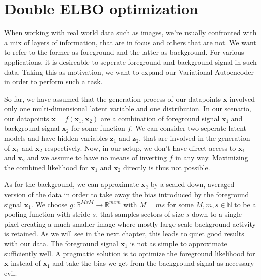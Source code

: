 \documentclass[12pt]{report}
\theoremstyle{definition}
\begin{document}
\section{Double ELBO optimization}
When working with real world data such as images, we're usually confronted with a mix of layers of information, that are in focus and others that are not. We want to refer to the former as foreground and the latter as background. For various applications, it is desireable to seperate foreground and background signal in such data. Taking this as motivation, we want to expand our Variational Autoencoder in order to perform such a task.

So far, we have assumed that the generation process of our datapoints $\mathbf{x}$ involved only one multi-dimensional latent variable and one distribution. In our scenario, our datapoints $\mathbf{x} = f(\mathbf{x}_1, \mathbf{x}_2)$ are a combination of foreground signal $\mathbf{x}_1$ and background signal $\mathbf{x}_2$ for some function $f$.
We can consider two seperate latent models and have hidden variables $\mathbf{z}_1$ and $\mathbf{z}_2$, that are involved in the generation of $\mathbf{x}_1$ and $\mathbf{x}_2$ respectively. Now, in our setup, we don't have direct access to $\mathbf{x}_1$ and $\mathbf{x}_2$ and we assume to have no means of inverting $f$ in any way. Maximizing the combined likelihood for $\mathbf{x}_1$ and $\mathbf{x}_2$ directly is thus not possible.

As for the background, we can approximate $\mathbf{x}_2$ by a scaled-down, averaged version of the data in order to take away the bias introduced by the foreground signal $\mathbf{x}_1$. We choose $g: \mathbb{R}^{MxM} \rightarrow \mathbb{R}^{mxm}$ with $M=ms$ for some $M, m, s \in \mathbb{N}$ to be a pooling function with stride $s$, that samples sectors of size $s$ down to a single pixel creating a much smaller image where mostly large-scale background activity is retained. As we will see in the next chapter, this leads to quiet good results with our data.
The foreground signal $\mathbf{x}_1$ is not as simple to approximate sufficiently well. A pragmatic solution is to optimize the foreground likelihood for $\mathbf{x}$ instead of $\mathbf{x}_1$ and take the bias we get from the background signal as necessary evil.
\end{document}
